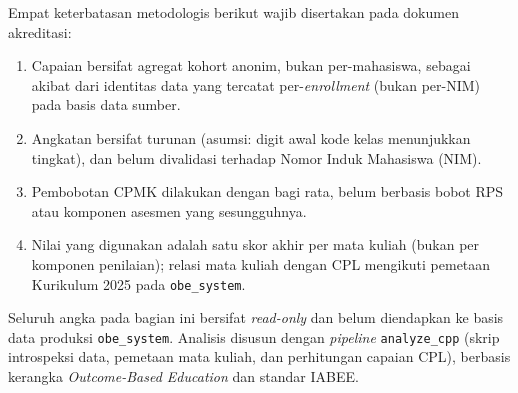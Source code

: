 Empat keterbatasan metodologis berikut wajib disertakan pada dokumen akreditasi:
\begin{enumerate}
\item Capaian bersifat agregat kohort anonim, bukan per-mahasiswa, sebagai akibat dari identitas data yang tercatat per-\textit{enrollment} (bukan per-NIM) pada basis data sumber.
\item Angkatan bersifat turunan (asumsi: digit awal kode kelas menunjukkan tingkat), dan belum divalidasi terhadap Nomor Induk Mahasiswa (NIM).
\item Pembobotan CPMK dilakukan dengan bagi rata, belum berbasis bobot RPS atau komponen asesmen yang sesungguhnya.
\item Nilai yang digunakan adalah satu skor akhir per mata kuliah (bukan per komponen penilaian); relasi mata kuliah dengan CPL mengikuti pemetaan Kurikulum 2025 pada \texttt{obe\_system}.
\end{enumerate}

Seluruh angka pada bagian ini bersifat \textit{read-only} dan belum diendapkan ke basis data produksi \texttt{obe\_system}. Analisis disusun dengan \textit{pipeline} \texttt{analyze\_cpp} (skrip introspeksi data, pemetaan mata kuliah, dan perhitungan capaian CPL), berbasis kerangka \textit{Outcome-Based Education} dan standar IABEE.
